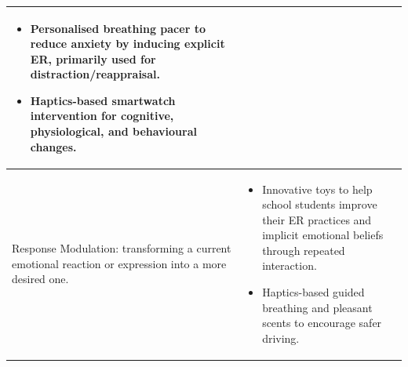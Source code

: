 \documentclass[lettersize,journal]{IEEEtran}
\begin{document}
\begin{table}[]
\begin{tabular}{m{2.7cm}m{5cm}}
\begin{itemize}
\item Personalised breathing pacer to reduce anxiety by inducing explicit ER, primarily used for distraction/reappraisal.
\item Haptics-based smartwatch intervention for cognitive, physiological, and behavioural changes.
\end{itemize}                        \\ \hline
Response Modulation: transforming a current emotional reaction or expression into a more desired one.                                    & \begin{itemize}
\item Innovative toys to help school students improve their ER practices and implicit emotional beliefs through repeated interaction.
\item Haptics-based guided breathing and pleasant scents to encourage safer driving.
\end{itemize}                      \\ \hline
\end{tabular}
\end{table}
\end{document}
